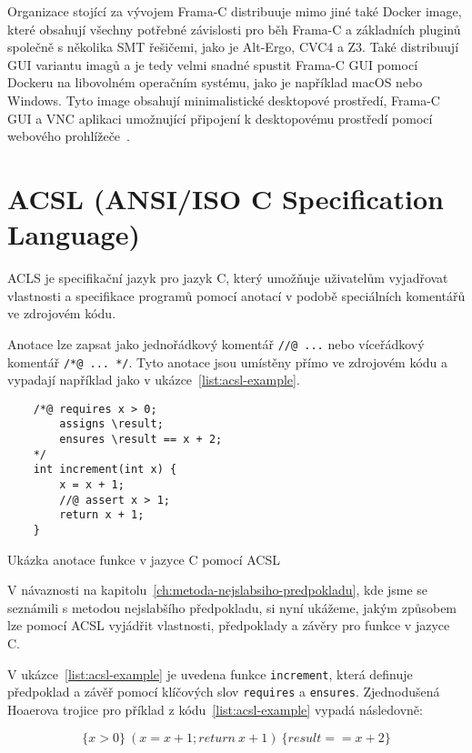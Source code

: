 Organizace stojící za vývojem Frama\mbox{-}C distribuuje mimo jiné také Docker image, které obsahují všechny potřebné závislosti
pro běh Frama\mbox{-}C a základních pluginů společně s několika SMT řešičemi, jako je Alt-Ergo, CVC4 a Z3.
Také distribuují GUI variantu imagů a je tedy velmi snadné spustit Frama\mbox{-}C GUI pomocí Dockeru na libovolném operačním systému,
jako je například macOS nebo Windows.
Tyto image obsahují minimalistické desktopové prostředí, Frama\mbox{-}C GUI a VNC aplikaci
umožnující připojení k desktopovému prostředí pomocí webového prohlížeče~\cite{FCDockerGUIMaroneze2021}.


\section{ACSL (ANSI/ISO C Specification Language)}
\label{sec:acsl}

ACLS je specifikační jazyk pro jazyk C, který umožňuje uživatelům
vyjadřovat vlastnosti a specifikace programů pomocí anotací v podobě speciálních komentářů ve zdrojovém kódu.

Anotace lze zapsat jako jednořádkový komentář \texttt{//@ ...} nebo víceřádkový komentář \texttt{/*@ ... */}.
Tyto anotace jsou umístěny přímo ve zdrojovém kódu a vypadají například jako v ukázce~\ref{list:acsl-example}.

\begin{listing}[H]
    \begin{verbatim}
    /*@ requires x > 0;
        assigns \result;
        ensures \result == x + 2;
    */
    int increment(int x) {
        x = x + 1;
        //@ assert x > 1;
        return x + 1;
    }
    \end{verbatim}
    \caption{Ukázka anotace funkce v jazyce C pomocí ACSL}
    \label{list:acsl-example}
\end{listing}

V návaznosti na kapitolu~\ref{ch:metoda-nejslabsiho-predpokladu}, kde jsme se seznámili
s metodou nejslabšího předpokladu, si nyní ukážeme, jakým způsobem lze pomocí ACSL
vyjádřit vlastnosti, předpoklady a závěry pro funkce v jazyce C.

V ukázce~\ref{list:acsl-example} je uvedena funkce \texttt{increment}, která
definuje předpoklad a závěř pomocí klíčových slov \texttt{requires} a \texttt{ensures}.
Zjednodušená Hoaerova trojice pro příklad z kódu~\ref{list:acsl-example} vypadá následovně:

\begin{equation*}
    \{ x > 0 \} \ (x = x + 1; return \  x + 1) \ \{ result == x + 2 \}
\end{equation*}

